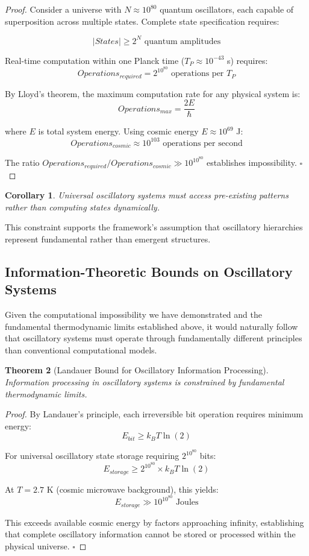 \documentclass[11pt]{article}
\newtheorem{theorem}{Theorem}[section]
\newtheorem{corollary}[theorem]{Corollary}
\theoremstyle{remark}
\begin{document}
\begin{proof}
Consider a universe with $N \approx 10^{80}$ quantum oscillators, each capable of superposition across multiple states. Complete state specification requires:

$$|States| \geq 2^N \text{ quantum amplitudes}$$

Real-time computation within one Planck time ($T_P \approx 10^{-43}$ s) requires:
$$Operations_{required} = 2^{10^{80}} \text{ operations per } T_P$$

By Lloyd's theorem, the maximum computation rate for any physical system is:
$$Operations_{max} = \frac{2E}{\hbar}$$

where $E$ is total system energy. Using cosmic energy $E \approx 10^{69}$ J:
$$Operations_{cosmic} \approx 10^{103} \text{ operations per second}$$

The ratio $Operations_{required}/Operations_{cosmic} \gg 10^{10^{80}}$ establishes impossibility. $\square$
\end{proof}

\begin{corollary}
Universal oscillatory systems must access pre-existing patterns rather than computing states dynamically.
\end{corollary}

This constraint supports the framework's assumption that oscillatory hierarchies represent fundamental rather than emergent structures.

\subsection{Information-Theoretic Bounds on Oscillatory Systems}

Given the computational impossibility we have demonstrated and the fundamental thermodynamic limits established above, it would naturally follow that oscillatory systems must operate through fundamentally different principles than conventional computational models.

\begin{theorem}[Landauer Bound for Oscillatory Information Processing]
Information processing in oscillatory systems is constrained by fundamental thermodynamic limits.
\end{theorem}

\begin{proof}
By Landauer's principle, each irreversible bit operation requires minimum energy:
$$E_{bit} \geq k_B T \ln(2)$$

For universal oscillatory state storage requiring $2^{10^{80}}$ bits:
$$E_{storage} \geq 2^{10^{80}} \times k_B T \ln(2)$$

At $T = 2.7$ K (cosmic microwave background), this yields:
$$E_{storage} \gg 10^{10^{80}} \text{ Joules}$$

This exceeds available cosmic energy by factors approaching infinity, establishing that complete oscillatory information cannot be stored or processed within the physical universe. $\square$
\end{proof}
\end{document}
